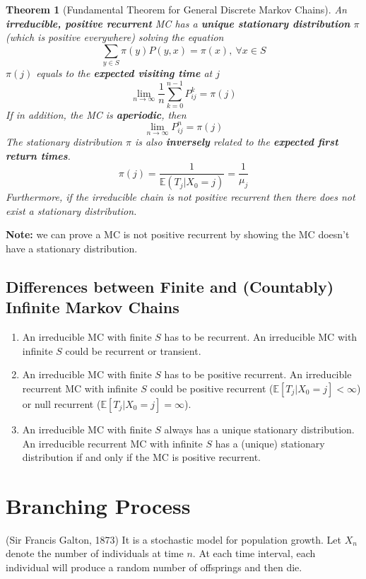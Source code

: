 \documentclass[11pt,a4paper]{article}
\newtheorem{theorem}{Theorem}
\begin{document}
\begin{theorem}[Fundamental Theorem for General Discrete Markov Chains]
    An \textbf{irreducible, positive recurrent} MC has a \textbf{unique stationary distribution} $\pi$ (which is positive everywhere) solving the equation
    $$\sum_{y\in S}\pi(y)P(y,x)=\pi(x),\ \forall x\in S$$
    $\pi(j)$ equals to the \textbf{expected visiting time} at $j$ $$\lim_{n \rightarrow \infty}\frac{1}{n}\sum_{k=0}^{n-1}P_{ij}^k=\pi(j)$$
    If in addition, the MC is \textbf{aperiodic}, then $$\lim_{n \rightarrow \infty}P_{ij}^n=\pi(j)$$
    The stationary distribution $\pi$ is also \textbf{inversely} related to the \textbf{expected first return times}. $$\pi(j)=\frac{1}{\mathbb{E}(T_j|X_0=j)}=\frac{1}{\mu_j}$$
    Furthermore, if the irreducible chain is not positive recurrent then there does not exist a stationary distribution.
\end{theorem}

\textbf{Note:} we can prove a MC is not positive recurrent by showing the MC doesn't have a stationary distribution.



\subsection{Differences between Finite and (Countably) Infinite Markov Chains}
\begin{enumerate}
    \item An irreducible MC with finite $S$ has to be recurrent. An irreducible MC with infinite $S$ could be recurrent or transient.
    \item An irreducible MC with finite $S$ has to be positive recurrent. An irreducible recurrent MC with infinite $S$ could be positive recurrent ($\mathbb{E}[T_j|X_0=j]<\infty$) or null recurrent ($\mathbb{E}[T_j|X_0=j]=\infty$).
    \item An irreducible MC with finite $S$ always has a unique stationary distribution. An irreducible recurrent MC with infinite $S$ has a (unique) stationary distribution if and only if the MC is positive recurrent.
\end{enumerate}

\section{Branching Process}
(Sir Francis Galton, 1873) It is a stochastic model for population growth. Let $X_n$ denote the number of individuals at time $n$. At each time interval, each individual will produce a random number of offsprings and then die.
\end{document}
